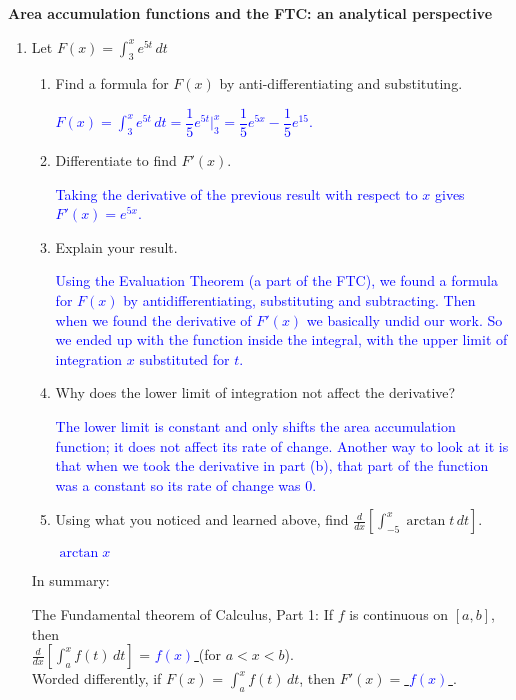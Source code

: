\documentclass[letterpaper,11pt]{article}
\def\ds{\displaystyle}
\newcommand{\usol}[1]{\underline{\hspace{.1 in} \textcolor{blue}{#1} \hspace{.1 in}}}
\newcommand{\sol}[1]{\textcolor{blue}{#1}}
\newcommand{\usol}[1]{\underline{\hspace{.1 in} \textcolor{white}{#1} \hspace{.1 in}}}
\newcommand{\sol}[1]{\textcolor{white}{#1}}
\begin{document}


{\large \textbf{Area accumulation functions and the FTC: an analytical perspective}} \\

\begin{enumerate}
\item Let $\ds F(x)=\int_3^x e^{5t} \, dt$

\begin{enumerate}
\item Find a formula for $F(x)$ by anti-differentiating and substituting.

\sol{$\ds F(x)=\int_3^x e^{5t} \, dt = \dfrac{1}{5} e^{5t}\Big|_3^x = \dfrac{1}{5}e^{5x}-\dfrac{1}{5}e^{15} $.}
\vfill

\item Differentiate to find $F'(x)$.

\sol{Taking the derivative of the previous result with respect to $x$ gives $F'(x)=e^{5x}$.}
\vfill

\item Explain your result.

\sol{Using the Evaluation Theorem (a part of the FTC), we found a formula for $F(x)$ by antidifferentiating, substituting and subtracting. Then when we found the derivative of $F'(x)$ we basically undid our work. So we ended up with the function inside the integral, with the upper limit of integration $x$ substituted for $t$.}
\vfill

\item Why does the lower limit of integration not affect the derivative?

\sol{The lower limit is constant and only shifts the area accumulation function; it does not affect its rate of change. Another way to look at it is that when we took the derivative in part (b), that part of the function was a constant so its rate of change was 0.}
\vfill

\item Using what you noticed and learned above, find $\ds \frac{d}{dx} \left[\int_{-5}^x \arctan{t} \,dt \right]$.

\sol{$\ds \arctan{x}$}
\vfill

\end{enumerate}


In summary:
\begin{framed}
The Fundamental theorem of Calculus, Part 1: If $f$ is continuous on $[a,b]$, then \\
$\ds \frac{d}{dx} \left[\int_{a}^x f(t)\,dt \right]$ = \usol{$f(x)$} (for $a<x<b$).\\
Worded differently, if $F(x)$ = $\ds \int_{a}^x f(t)\,dt$, then $F'(x) = $\usol{$f(x)$}.
\end{framed}


\end{enumerate}
\end{document}
